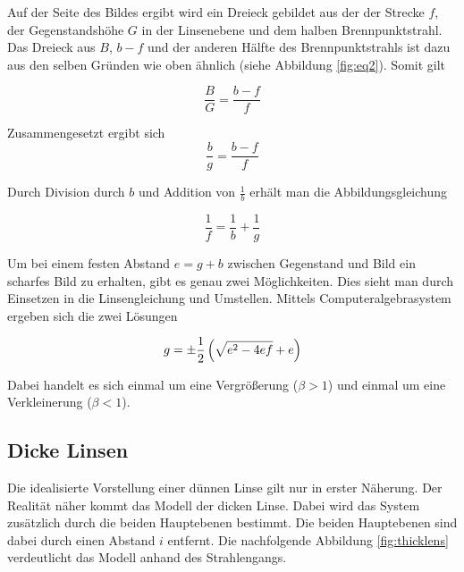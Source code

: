 \documentclass[a4paper,german,12pt,smallheadings]{scrartcl}
\begin{document}
Auf der Seite des Bildes ergibt wird ein Dreieck gebildet aus der der Strecke
$f$, der Gegenstandshöhe $G$ in der Linsenebene und dem halben
Brennpunktstrahl. Das Dreieck aus $B$, $b-f$ und der anderen Hälfte des
Brennpunktstrahls ist dazu aus den selben Gründen wie oben ähnlich (siehe
Abbildung \ref{fig:eq2}). Somit gilt

\begin{equation*}
  \frac{B}{G} = \frac{b-f}{f}
\end{equation*}

Zusammengesetzt ergibt sich
\begin{equation}
  \frac{b}{g} = \frac{b-f}{f}
  \label{eq:inter}
\end{equation}

Durch Division durch $b$ und Addition von $\frac{1}{b}$ erhält man die
Abbildungsgleichung

\begin{equation}
  \frac{1}{f} = \frac{1}{b} + \frac{1}{g}
\end{equation}

Um bei einem festen Abstand $e = g+b$ zwischen Gegenstand und Bild ein scharfes
Bild zu erhalten, gibt es genau zwei Möglichkeiten. Dies sieht man durch
Einsetzen in die Linsengleichung und Umstellen. Mittels Computeralgebrasystem
ergeben sich die zwei Lösungen

\begin{equation}
  g = \pm \frac{1}{2} \del{\sqrt{e^2 - 4ef} + e}
\end{equation}

Dabei handelt es sich einmal um eine Vergrößerung ($\beta > 1$) und einmal um
eine Verkleinerung ($\beta < 1$).


\subsection{Dicke Linsen}

Die idealisierte Vorstellung einer dünnen Linse gilt nur in erster Näherung.
Der Realität näher kommt das Modell der dicken Linse. Dabei wird das System
zusätzlich durch die beiden Hauptebenen bestimmt.  Die beiden Hauptebenen sind
dabei durch einen Abstand $i$ entfernt.  Die nachfolgende Abbildung
\ref{fig:thicklens} verdeutlicht das Modell anhand des Strahlengangs.
\end{document}
